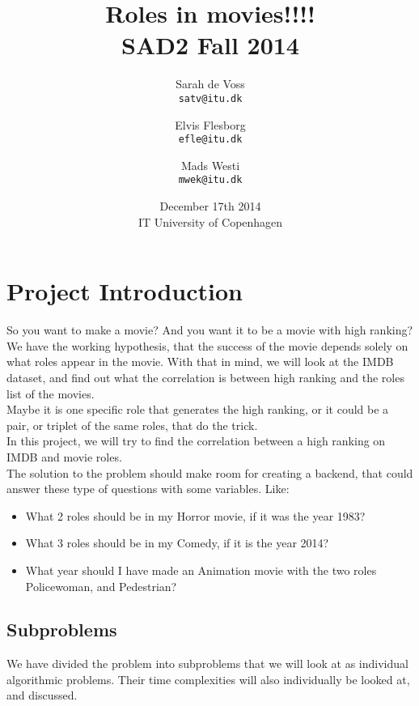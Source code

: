 \documentclass[a4paper,11pt]{article}
\begin{document}
\date{December 17th 2014\\ IT University of Copenhagen}
\title{Roles in movies!!!!\\SAD2 Fall 2014}

\author{Sarah de Voss\\
\texttt{satv@itu.dk}
\and Elvis Flesborg\\
\texttt{efle@itu.dk}
\and Mads Westi\\
\texttt{mwek@itu.dk}}
\clearpage\maketitle
\newpage
\thispagestyle{empty}
\setcounter{page}{1}
\tableofcontents
\newpage
\section{Project Introduction}
So you want to make a movie? And you want it to be a movie with high ranking? We have the working hypothesis, that the success of the movie depends solely on what roles appear in the movie. With that in mind, we will look at the IMDB dataset, and find out what the correlation is between high ranking and the roles list of the movies.\\
Maybe it is one specific role that generates the high ranking, or it could be a pair, or triplet of the same roles, that do the trick.\\
In this project, we will try to find the correlation between a high ranking on IMDB and movie roles.\\
The solution to the problem should make room for creating a backend, that could answer these type of questions with some variables. Like: \\

\begin{itemize}
\item What 2 roles should be in my Horror movie, if it was the year 1983?
\item What 3 roles should be in my Comedy, if it is the year 2014?
\item What year should I have made an Animation movie with the two roles Policewoman, and Pedestrian?
\end{itemize}


\subsection{Subproblems}
We have divided the problem into subproblems that we will look at as individual algorithmic problems. Their time complexities will also individually be looked at, and discussed.\\
\end{document}
